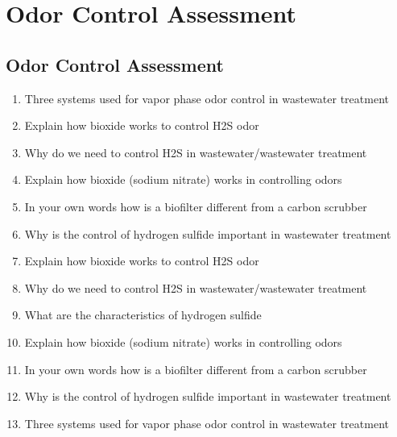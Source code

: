 
\chapter{Odor Control Assessment}

\section*{Odor Control Assessment}


\begin{enumerate}
\item Three systems used for vapor phase odor control in wastewater treatment 

\item Explain how bioxide works to control H2S odor 

\item Why do we need to control H2S in wastewater/wastewater treatment 

\item Explain how bioxide (sodium nitrate) works in controlling odors 

\item In your own words how is a biofilter different from a carbon scrubber

\item Why is the control of hydrogen sulfide important in wastewater treatment 

\item Explain how bioxide works to control H2S odor 

\item Why do we need to control H2S in wastewater/wastewater treatment 

\item  What are the characteristics of hydrogen sulfide 

\item  Explain how bioxide (sodium nitrate) works in controlling odors 

\item  In your own words how is a biofilter different from a carbon scrubber

\item  Why is the control of hydrogen sulfide important in wastewater treatment 

\item  Three systems used for vapor phase odor control in wastewater treatment 


\end{enumerate}
